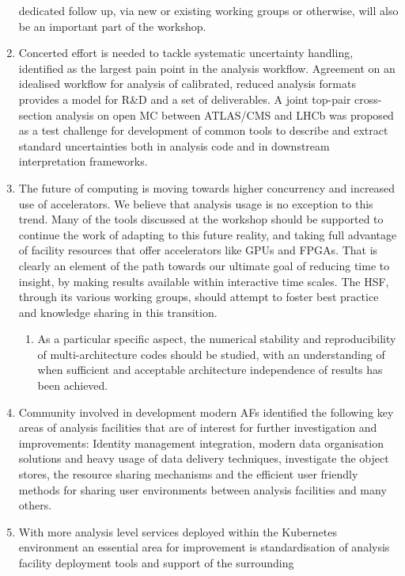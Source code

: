 \documentclass[a4paper,11pt]{article}
\begin{document}
\begin{enumerate}
  dedicated follow up, via new or existing working groups or otherwise,
  will also be an important part of the workshop.
\item
  Concerted effort is needed to tackle systematic uncertainty handling,
  identified as the largest pain point in the analysis workflow.
  Agreement on an idealised workflow for analysis of calibrated, reduced
  analysis formats provides a model for R\&D and a set of deliverables.
  A joint top-pair cross-section analysis on open MC between ATLAS/CMS
  and LHCb was proposed as a test challenge for development of common
  tools to describe and extract standard uncertainties both in analysis
  code and in downstream interpretation frameworks.
\item
  The future of computing is moving towards higher concurrency and
  increased use of accelerators. We believe that analysis usage is no
  exception to this trend. Many of the tools discussed at the workshop
  should be supported to continue the work of adapting to this future
  reality, and taking full advantage of facility resources that offer
  accelerators like GPUs and FPGAs. That is clearly an element of the
  path towards our ultimate goal of reducing time to insight, by making
  results available within interactive time scales. The HSF, through its
  various working groups, should attempt to foster best practice and
  knowledge sharing in this transition.
  \begin{enumerate}
  \item
    As a particular specific aspect, the numerical stability and
    reproducibility of multi-architecture codes should be studied, with
    an understanding of when sufficient and acceptable architecture
    independence of results has been achieved.
  \end{enumerate}
\item
  Community involved in development modern AFs identified the following
  key areas of analysis facilities that are of interest for further
  investigation and improvements: Identity management integration,
  modern data organisation solutions and heavy usage of data delivery
  techniques, investigate the object stores, the resource sharing
  mechanisms and the efficient user friendly methods for sharing user
  environments between analysis facilities and many others.
\item
  With more analysis level services deployed within the Kubernetes
  environment an essential area for improvement is standardisation of
  analysis facility deployment tools and support of the surrounding

\end{enumerate}
\end{document}
